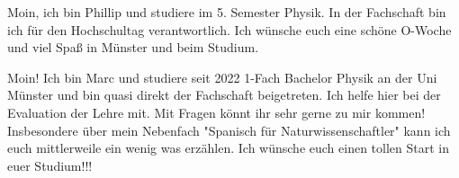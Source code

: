 \begin{multicols}{2}


{
Moin, ich bin Phillip und studiere im 5. Semester Physik. In der Fachschaft bin ich für den Hochschultag verantwortlich. Ich wünsche euch eine schöne O-Woche und viel Spaß in Münster und beim Studium. 
}

\vspace{-0.3cm}

{
Moin! Ich bin Marc und studiere seit 2022 1-Fach Bachelor Physik an der Uni Münster und bin quasi direkt der Fachschaft beigetreten. Ich helfe hier bei der Evaluation der Lehre mit. Mit Fragen könnt ihr sehr gerne zu mir kommen! Insbesondere über mein Nebenfach "Spanisch für Naturwissenschaftler" kann ich euch mittlerweile ein wenig was erzählen. Ich wünsche euch einen tollen Start in euer Studium!!! 
} 

\vspace{-0.5cm}


\end{multicols}
